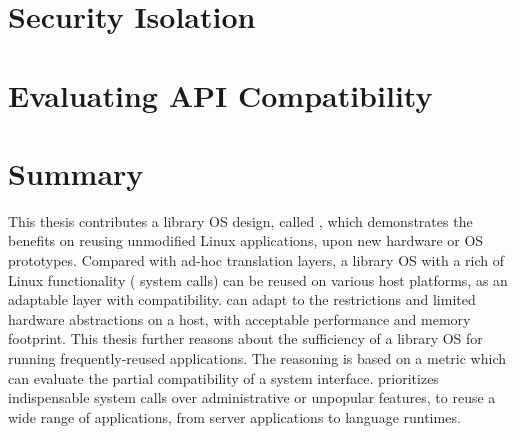 \section{Security Isolation}
\label{sec:intro:security}





\section{Evaluating API Compatibility}




\section{Summary}

This thesis contributes a library OS design, called \graphene{},
which demonstrates the benefits on reusing unmodified Linux applications, upon new hardware or OS prototypes.
Compared with ad-hoc translation layers,
a library OS with a rich of Linux functionality (\graphenesyscallnum{} system calls) can be reused on various host platforms, as an adaptable layer with compatibility.
\graphene{} can adapt to the restrictions and
limited hardware abstractions on a host, with acceptable performance and memory footprint.
This thesis further reasons about the sufficiency of a library OS
for running frequently-reused applications. The reasoning is based on a metric which can evaluate the partial compatibility of a system interface.
\graphene{} prioritizes indispensable system calls over administrative or unpopular features,
to reuse a wide range of applications, from server applications to language runtimes.


